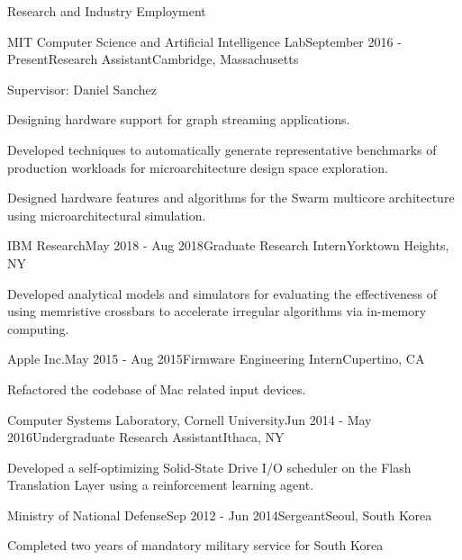 \documentclass{resume} %
\begin{document}
\begin{rSection}{Research and Industry Employment}

\begin{rSubsection}{MIT Computer Science and Artificial Intelligence Lab}{September 2016 - Present}{Research Assistant}{Cambridge, Massachusetts}

\item Supervisor: Daniel Sanchez
\item Designing hardware support for graph streaming applications.
\item Developed techniques to automatically generate representative benchmarks of production workloads
for microarchitecture design space exploration.
\item Designed hardware features and algorithms for the Swarm multicore architecture using microarchitectural simulation.
\end{rSubsection}

\begin{rSubsection}{IBM Research}{May 2018 - Aug 2018}{Graduate Research Intern}{Yorktown Heights, NY}

\item Developed analytical models and simulators for evaluating the effectiveness of using memristive crossbars
to accelerate irregular algorithms via in-memory computing.
\end{rSubsection}

\begin{rSubsection}{Apple Inc.}{May 2015 - Aug 2015}{Firmware Engineering Intern}{Cupertino, CA}

\item Refactored the codebase of Mac related input devices. 
\end{rSubsection}

\begin{rSubsection}{Computer Systems Laboratory, Cornell University}{Jun 2014 - May 2016}{Undergraduate Research Assistant}{Ithaca, NY}

\item Developed a self-optimizing Solid-State Drive I/O scheduler on the Flash Translation Layer using a reinforcement learning agent. 
\end{rSubsection}

\begin{rSubsection}{Ministry of National Defense}{Sep 2012 - Jun 2014}{Sergeant}{Seoul, South Korea}

\item Completed two years of mandatory military service for South Korea
\end{rSubsection}

\end{rSection}
\end{document}
